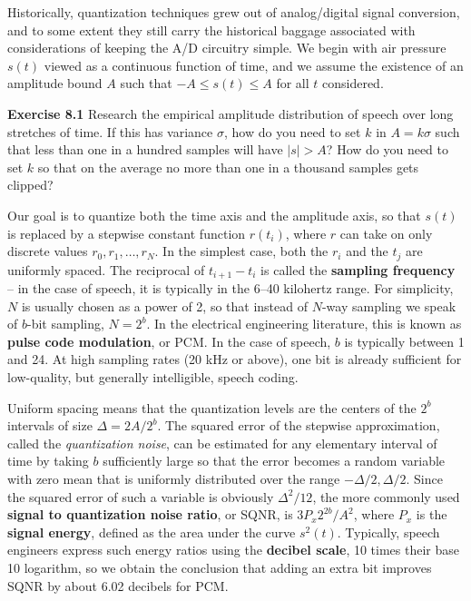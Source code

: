 Historically, quantization techniques grew out of analog/digital signal
conversion, and to some extent they still carry the historical baggage
associated with considerations of keeping the A/D circuitry simple. We begin
with air pressure $s(t)$ viewed as a continuous function of time, and we
assume the existence of an amplitude bound $A$ such that $-A \leq s(t) \leq A$
for all $t$ considered. 

\smallskip
\noindent
{\bf Exercise 8.1} Research the empirical amplitude distribution of speech
over long stretches of time. If this has variance $\sigma$, how do you need to
set $k$ in $A=k\sigma$ such that less than one in a hundred samples will have
$|s| > A$? How do you need to set $k$ so that on the average no more than
one in a thousand samples gets clipped? 

\smallskip
\noindent
Our goal is to quantize both the time axis and the amplitude axis, so that
$s(t)$ is replaced by a stepwise constant function $r(t_i)$, where $r$ can take
on only discrete values $r_0, r_1, \ldots , r_N$.  In the simplest case, both
the $r_i$ and the $t_j$ are uniformly spaced. The reciprocal of $t_{i+1} -
t_i$ is called the {\bf sampling frequency} -- in the case of speech, it is
typically in the 6--40 kilohertz range. For simplicity, $N$ is usually chosen
as a power of 2, so that instead of $N$-way sampling we speak of $b$-bit
sampling, $N=2^b$. In the electrical engineering literature, this is known as
{\bf pulse code modulation}, or PCM. In the case of speech, $b$ is typically
between 1 and 24. At high sampling rates (20 kHz or above), one bit is already
sufficient for low-quality, but generally intelligible, speech coding.

Uniform spacing means that the quantization levels are the centers of the
$2^b$ intervals of size $\Delta = 2A/2^b$. The squared error of the stepwise
approximation, called the {\it quantization noise}, can be estimated for any
elementary interval of time by taking $b$ sufficiently large so that the error
becomes a random variable with zero mean that is uniformly distributed over
the range $-\Delta/2,\Delta/2$. Since the squared error of such a variable is
obviously $\Delta^2/12$, the more commonly used {\bf signal to quantization
  noise ratio}, or SQNR, is $3P_x2^{2b}/A^2$, where $P_x$ is the {\bf signal
  energy}, defined as the area under the curve $s^2(t)$. Typically, speech
engineers express such energy ratios using the {\bf decibel scale}, 10 times
their base 10 logarithm, so we obtain the conclusion that adding an extra bit
improves SQNR by about 6.02 decibels for PCM.

